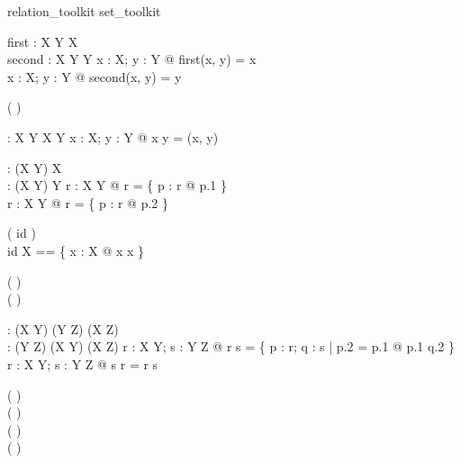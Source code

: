 \begin{zsection}
  \SECTION relation\_toolkit \parents set\_toolkit
\end{zsection}

\begin{gendef}[X, Y]
  first : X \cross Y \fun X\\
  second : X \cross Y \fun Y
\where
  \forall x : X; y : Y @ first(x, y) = x\\
  \forall x : X; y : Y @ second(x, y) = y
\end{gendef}

\begin{zed}
   \leftassoc ( \varg \mapsto \varg )
\end{zed}

\begin{gendef}[X, Y]
  \varg \mapsto \varg : X \cross Y \fun X \cross Y
\where
  \forall x : X; y : Y @ x \mapsto y = (x, y)
\end{gendef}

\begin{gendef}[X, Y]
  \dom : (X \rel Y) \fun \power X\\
  \ran : (X \rel Y) \fun \power Y
\where
  \forall r : X \rel Y @ \dom r = \{ p : r @ p.1 \}\\
  \forall r : X \rel Y @ \ran r = \{ p : r @ p.2 \}
\end{gendef}

\begin{zed}
   ( id \varg )\\
  id X == \{ x : X @ x \mapsto x \}
\end{zed}

\begin{zed}
   \leftassoc ( \varg \comp \varg )\\
   \leftassoc ( \varg \circ \varg )
\end{zed}

\begin{gendef}[X, Y, Z]
  \varg \comp \varg : (X \rel Y) \cross (Y \rel Z) \fun (X \rel Z)\\
  \varg \circ \varg : (Y \rel Z) \cross (X \rel Y) \fun (X \rel Z)
\where
  \forall r : X \rel Y; s : Y \rel Z @ r \comp s = 
      \{ p : r; q : s | p.2 = p.1 @ p.1 \mapsto q.2 \}\\
  \forall r : X \rel Y; s : Y \rel Z @ s \circ r = r \comp s
\end{gendef}

\begin{zed}
   \rightassoc ( \varg \dres \varg )\\
   \rightassoc ( \varg \rres \varg )\\
   \rightassoc ( \varg \ndres \varg )\\
   \rightassoc ( \varg \nrres \varg )
\end{zed}

